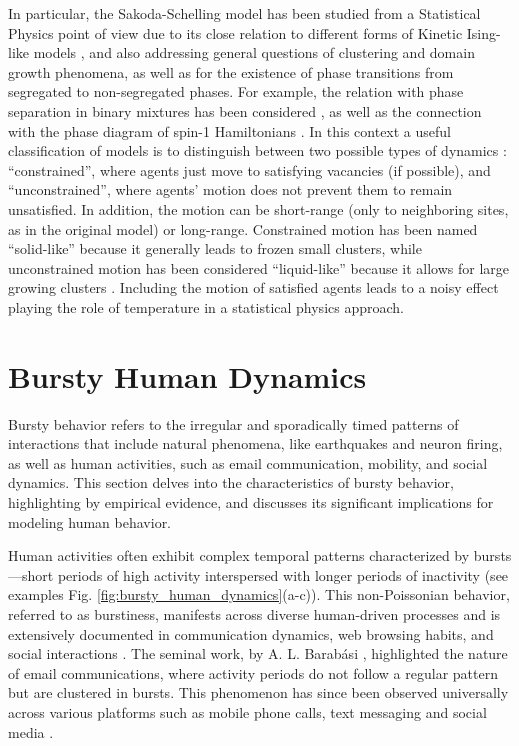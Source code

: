 In particular, the Sakoda-Schelling model has been studied from a Statistical Physics point of view due to its close relation to different forms of Kinetic Ising-like models \cite{stauffer-2007,stauffer-2013}, and also addressing general questions of clustering and domain growth phenomena, as well as for the existence of phase transitions from segregated to non-segregated phases. For example, the relation with phase separation in binary mixtures has been considered \cite{Dall_Asta_2008,Vinkovic}, as well as the connection with the phase diagram of spin-1 Hamiltonians \cite{BEG,BlumeCapel,Gauvin_2009,Gauvin_2010}. In this context a useful classification of models is to distinguish between two possible types of dynamics \cite{Dall_Asta_2008}: ``constrained'', where agents just move to satisfying vacancies (if possible), and ``unconstrained'',  where agents' motion does not prevent them to remain unsatisfied. In addition, the motion can be short-range (only to neighboring sites, as in the original model) or long-range. Constrained motion has been named ``solid-like'' because it generally leads to frozen small clusters, while unconstrained motion has been considered ``liquid-like'' because it allows for large growing clusters \cite{Vinkovic}. Including the motion of satisfied agents leads to a noisy effect playing the role of temperature in a statistical physics approach. 

\section{\label{sec: Bursty Human Dynamics} Bursty Human Dynamics}

Bursty behavior refers to the irregular and sporadically timed patterns of interactions that include natural phenomena, like earthquakes and neuron firing, as well as human activities, such as email communication, mobility, and social dynamics. This section delves into the characteristics of bursty behavior, highlighting by empirical evidence, and discusses its significant implications for modeling human behavior.

Human activities often exhibit complex temporal patterns characterized by bursts---short periods of high activity interspersed with longer periods of inactivity (see examples Fig. \ref{fig:bursty_human_dynamics}(a-c)). This non-Poissonian behavior, referred to as burstiness, manifests across diverse human-driven processes and is extensively documented in communication dynamics, web browsing habits, and social interactions \cite{Barabasi2005Bursts, Vazquez2006Bursts}. The seminal work, by A. L. Barabási \cite{Barabasi2005Bursts}, highlighted the nature of email communications, where activity periods do not follow a regular pattern but are clustered in bursts. This phenomenon has since been observed universally across various platforms such as mobile phone calls, text messaging and social media \cite{karsai-2011, Miritello2013Capacity,moro,artime-2017,rybski-2012,zignani-2016,kumar-2020,iribarren-2009}.

